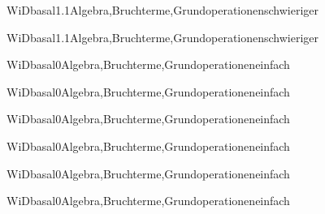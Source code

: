 \documentclass[12pt]{article}
\begin{document}
    \begin{Add}{WiD}{basal1.1}{Algebra,Bruchterme,Grundoperationen}{schwieriger}
    \solution{ }
    \end{Add}
    \begin{Add}{WiD}{basal1.1}{Algebra,Bruchterme,Grundoperationen}{schwieriger}
    \end{Add}
    

    \begin{Add}{WiD}{basal0}{Algebra,Bruchterme,Grundoperationen}{einfach}
    \solution{ }
    \end{Add}
    \begin{Add}{WiD}{basal0}{Algebra,Bruchterme,Grundoperationen}{einfach}
    \end{Add}
    

    \begin{Add}{WiD}{basal0}{Algebra,Bruchterme,Grundoperationen}{einfach}
    \solution{ }
    \end{Add}
    \begin{Add}{WiD}{basal0}{Algebra,Bruchterme,Grundoperationen}{einfach}
    \end{Add}
    

    \begin{Add}{WiD}{basal0}{Algebra,Bruchterme,Grundoperationen}{einfach}
    \solution{ }
    \end{Add}
    \begin{Add}{WiD}{basal0}{Algebra,Bruchterme,Grundoperationen}{einfach}
    \end{Add}
    
\end{document}
